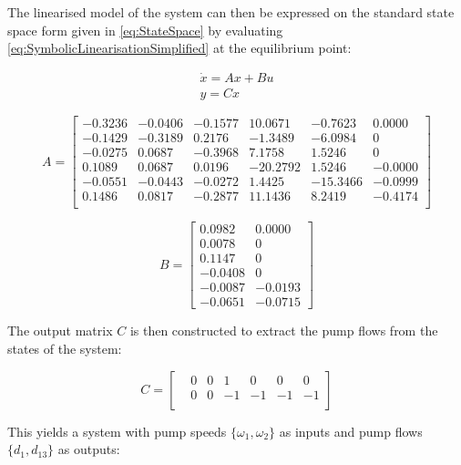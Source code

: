 The linearised model of the system can then be expressed on the standard state space form given in \cref{eq:StateSpace} by evaluating \cref{eq:SymbolicLinearisationSimplified} at the equilibrium point: 

\begin{equation}\label{eq:StateSpace}
	\begin{split}
	\dot{x} = Ax + Bu \\
	y = Cx
	\end{split}
\end{equation}

\begin{equation}
	A = \begin{bmatrix}
		-0.3236 & -0.0406 & -0.1577 & 10.0671 & -0.7623 & 0.0000\\
		-0.1429 & -0.3189 & 0.2176 & -1.3489 & -6.0984  & 0\\
		-0.0275 & 0.0687 & -0.3968 & 7.1758 & 1.5246 & 0\\
		0.1089 & 0.0687 & 0.0196 & -20.2792 & 1.5246 & -0.0000\\
		-0.0551 & -0.0443 & -0.0272 & 1.4425 & -15.3466 &   -0.0999\\
		0.1486 & 0.0817 & -0.2877 & 11.1436 & 8.2419 & -0.4174\\
	\end{bmatrix}
\end{equation}

\begin{equation}
	B = \begin{bmatrix}
		0.0982 & 0.0000\\
		0.0078 & 0 \\
		0.1147 & 0 \\
		-0.0408 & 0 \\
		-0.0087 & -0.0193\\
		-0.0651 & -0.0715
	\end{bmatrix}
\end{equation}

The output matrix $ C $ is then constructed to extract the pump flows from the states of the system:

\begin{equation}
C =	\begin{bmatrix}
	&0&0&1&0&0&0\\
	&0&0&-1&-1&-1&-1\\	
\end{bmatrix} 
\end{equation}

This yields a system with pump speeds $ \{\omega_1 , \omega_2 \} $ as inputs and pump flows $ \{d_1, d_{13}\} $ as outputs:


